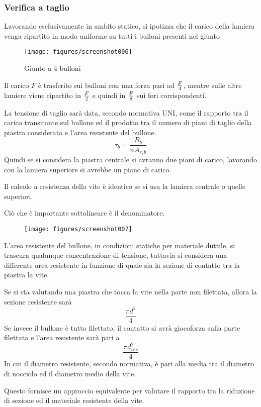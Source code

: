 \documentclass[a4paper, 15pt]{article}
\begin{document}
\subsubsection{Verifica a taglio}
\begin{adjustwidth}{2in}{}	 	 
	 Lavorando esclusivamente in ambito statico, si ipotizza che il carico della lamiera venga ripartito in modo uniforme su tutti i bulloni presenti nel giunto
	 \begin{figure}[H]
	 	\centering
	 	\texttt{[image: figures/screenshot006]}
	 	\caption{Giunto a 4 bulloni}
	 	\label{fig:screenshot006}
	 \end{figure}
	 Il carico $F$ è trasferito sui bulloni con una forza pari ad $F\over4$, mentre sulle altre lamiere viene ripartito in $F\over2$ e quindi in $F\over8$ sui fori corrispondenti. 
	 
	 La tensione di taglio sarà data, secondo normativa UNI, come il rapporto tra il carico transitante sul bullone ed il prodotto tra il numero di piani di taglio della piastra considerata e l'area resistente del bullone. 
	 \[\tau_b = \dfrac{R_b}{nA_{r,b}}\]
	 Quindi se si considera la piastra centrale si avranno due piani di carico, lavorando con la lamiera superiore si avrebbe un piano di carico.
	 
	 Il calcolo a resistenza della vite è identico se si usa la lamiera centrale o quelle superiori. 
	 
	 Ciò che è importante sottolineare è il denominatore. 	
\begin{figure}[H]
	\centering
	\texttt{[image: figures/screenshot007]}
	\label{fig:screenshot007}
\end{figure}
	L'area resistente del bullone, in condizioni statiche per materiale duttile, si trascura qualunque concentrazione di tensione, tuttavia si considera una differente area resistente in funzione di quale sia la sezione di  contatto tra la piastra la vite. 
	
	Se si sta valutando una piastra che tocca la vite nella parte non filettata, allora la sezione resistente sarà 
	\[\dfrac{\pi d^2}{4}\] 
	Se invece il bullone è tutto filettato, il contatto si avrà giocoforza sulla parte filettata e l'area resistente sarà pari a 
	\[\dfrac{\pi d_{res}^2}{4}\]
	In cui il diametro resistente, secondo normativa, è pari alla media tra il diametro di nocciolo ed il diametro medio della vite. 
	
	Questo fornisce un approccio equivalente per valutare il rapporto tra la riduzione di sezione ed il materiale resistente della vite.  
\end{adjustwidth}
\newpage
\end{document}
